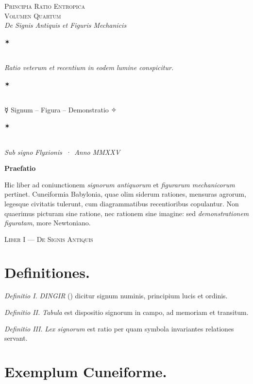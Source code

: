 \documentclass[12pt]{article}
\newcommand{\dingir}{\centerline{\Large \ornament{𒀭}}}
\newcommand{\aster}{\centerline{✶}}
\newcommand{\divider}{\vspace{1em}\dingir\vspace{1em}}
\newcommand{\Liber}[1]{\vspace{1ex}\begin{center}\Large\textsc{Liber #1}\end{center}\vspace{-0.5ex}\dingir\vspace{0.5ex}}
\begin{document}
\begin{center}
{\Large \textsc{Principia Ratio Entropica}}\\[-0.25ex]
{\small \textsc{Volumen Quartum}}\\[0.5ex]
{\itshape De Signis Antiquis et Figuris Mechanicis}\\[1.25em]
\aster\\[0.5em]
{\itshape Ratio veterum et recentium in eodem lumine conspicitur.}\\[0.5em]
\aster\\[0.75em]
{\large ☿\; Signum \;--\; Figura \;--\; Demonstratio \;✧}\\[0.75em]
\aster\\[0.25em]
{\itshape Sub signo Flyxionis \,·\, Anno MMXXV}
\end{center}

\divider

\begin{center}\textbf{Praefatio}\end{center}

Hic liber ad coniunctionem \textit{signorum antiquorum} et \textit{figurarum mechanicorum} pertinet. Cuneiformia Babylonia, quae olim siderum rationes, mensuras agrorum, legesque civitatis tulerunt, cum diagrammatibus recentioribus copulantur. Non quaerimus picturam sine ratione, nec rationem sine imagine: sed \textit{demonstrationem figuratam}, more Newtoniano.

\divider

\Liber{I — De Signis Antiquis}

\section*{Definitiones.}

\textit{Definitio I.} \; \textit{DINGIR} () dicitur signum numinis, principium lucis et ordinis.

\textit{Definitio II.} \; \textit{Tabula} est dispositio signorum in campo, ad memoriam et transitum.

\textit{Definitio III.} \; \textit{Lex signorum} est ratio per quam symbola invariantes relationes servant.

\section*{Exemplum Cuneiforme.}
\end{document}
